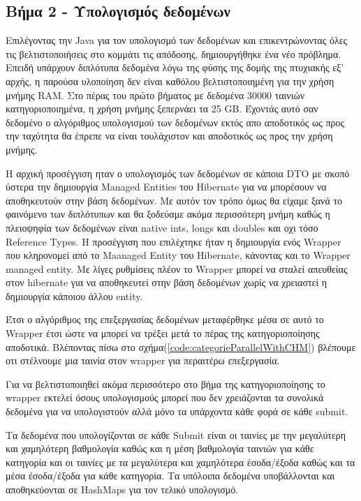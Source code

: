 \subsection{Βήμα 2 - Υπολογισμός  δεδομένων}

Επιλέγοντας την Java για τον υπολογισμό των δεδομένων και επικεντρώνοντας όλες τις βελτιστοποιήσεις στο κομμάτι τις απόδοσης, δημιουργήθηκε ένα νέο πρόβλημα. Επειδή υπάρχουν διπλότυπα δεδομένα λόγω της φύσης της δομής της πτυχιακής εξ' αρχής, η παρούσα υλοποίηση δεν είναι καθόλου βελτιστοποιημένη για την χρήση μνήμης RAM. Στο πέρας του πρώτο βήματος με δεδομένα 30000 ταινιών κατηγοριοποιημένα, η χρήση μνήμης ξεπερνάει τα 25 GB. Έχοντάς αυτό σαν δεδομένο ο αλγόριθμος υπολογισμού των δεδομένων εκτός απο αποδοτικός ως προς την ταχύτητα θα έπρεπε να είναι τουλάχιστον και αποδοτικός ως προς την χρήση μνήμης.

Η αρχική προσέγγιση ηταν ο υπολογισμός των δεδομένων σε κάποια DTO με σκοπό ύστερα την δημιουργία Managed Entities του Hibernate για να μπορέσουν να αποθηκευτούν στην βάση δεδομένων. Με αυτόν τον τρόπο όμως θα είχαμε ξανά το φαινόμενο των διπλότυπων και θα ξοδεύαμε ακόμα περισσότερη μνήμη καθώς η πλειοψηφία των δεδομένων είναι native ints, longs και doubles και οχι τόσο Reference Types. Η προσέγγιση που επιλέχτηκε ήταν η δημιουργία 
ενός Wrapper που κληρονομεί από το Maanaged Entity του Hibernate, κάνοντας και το Wrapper managed entity. Με λίγες ρυθμίσεις πλέον το Wrapper μπορεί να σταλεί απευθείας στον hibernate για να αποθηκευτεί στην βάση δεδομένων χωρίς να χρειαστεί η δημιουργία κάποιου άλλου entity.

Έτσι ο αλγόριθμος της επεξεργασίας δεδομένων μεταφέρθηκε μέσα σε αυτό το Wrapper έτσι ώστε να μπορεί να τρέξει μετά το πέρας της κατηγοριοποίησης αποδοτικά. Βλέποντας πίσω στο σχήμα(\ref{code:categorieParallelWithCHM}) βλέπουμε οτι στέλνουμε μια ταινία στον wrapper για περαιτέρω επεξεργασία. 

Για να βελτιστοποιηθεί ακόμα περισσότερο στο βήμα της κατηγοριοποίησης το wrapper εκτελεί όσους υπολογισμούς μπορεί που δεν χρειάζονται τα συνολικά δεδομένα για να υπολογιστούν αλλά μόνο τα υπάρχοντα κάθε φορά σε κάθε submit.

Τα δεδομένα που υπολογίζονται σε κάθε Submit είναι οι ταινίες με την μεγαλύτερη και χαμηλότερη βαθμολογία καθώς και η μέση βαθμολογία ταινιών για κάθε κατηγορία και οι ταινίες με τα μεγαλύτερα και χαμηλότερα έσοδα/έξοδα καθώς και τα μέσα έσοδα/έξοδα για κάθε κατηγορία. Τα υπόλοιπα δεδομένα υποβάλλονται και αποθηκεύονται σε HashMaps για τον τελικό υπολογισμό.

